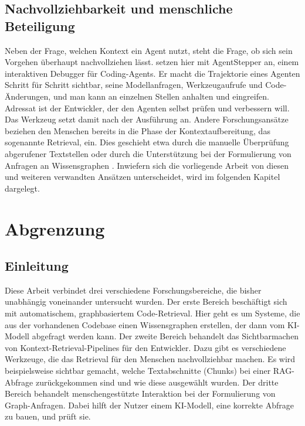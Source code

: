 \subsection{Nachvollziehbarkeit und menschliche Beteiligung}

Neben der Frage, welchen Kontext ein Agent nutzt, steht die Frage, ob sich sein Vorgehen überhaupt nachvollziehen lässt. \textcite{agentstepper2026} setzen hier mit AgentStepper an, einem interaktiven Debugger für Coding-Agents. Er macht die Trajektorie eines Agenten Schritt für Schritt sichtbar, seine Modellanfragen, Werkzeugaufrufe und Code-Änderungen, und man kann an einzelnen Stellen anhalten und eingreifen. Adressat ist der Entwickler, der den Agenten selbst prüfen und verbessern will. Das Werkzeug setzt damit nach der Ausführung an. Andere Forschungsansätze beziehen den Menschen bereits in die Phase der Kontextaufbereitung, das sogenannte Retrieval, ein. Dies geschieht etwa durch die manuelle Überprüfung abgerufener Textstellen \parencite[raggy,][]{romerolauro2025raggy} oder durch die Unterstützung bei der Formulierung von Anfragen an Wissensgraphen \parencites[LinkQ,][]{li2024linkq}[]{pusch2026hitlkgqa}. Inwiefern sich die vorliegende Arbeit von diesen und weiteren verwandten Ansätzen unterscheidet, wird im folgenden Kapitel dargelegt.

\section{Abgrenzung}
\subsection{Einleitung}
Diese Arbeit verbindet drei verschiedene Forschungsbereiche, die bisher unabhängig voneinander untersucht wurden. Der erste Bereich beschäftigt sich mit automatischem, graphbasiertem Code-Retrieval. Hier geht es um Systeme, die aus der vorhandenen Codebase einen Wissensgraphen erstellen, der dann vom KI-Modell abgefragt werden kann. Der zweite Bereich behandelt das Sichtbarmachen von Kontext-Retrieval-Pipelines für den Entwickler. Dazu gibt es verschiedene Werkzeuge, die das Retrieval für den Menschen nachvollziehbar machen. Es wird beispielsweise sichtbar gemacht, welche Textabschnitte (Chunks) bei einer RAG-Abfrage zurückgekommen sind und wie diese ausgewählt wurden. Der dritte Bereich behandelt menschengestützte Interaktion bei der Formulierung von Graph-Anfragen. Dabei hilft der Nutzer einem KI-Modell, eine korrekte Abfrage zu bauen, und prüft sie.

